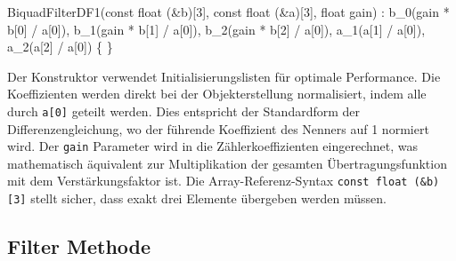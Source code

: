 \documentclass[
  ngerman,
  letterpaper,
  DIV=11]{scrreprt}
\newenvironment{Shaded}{\begin{snugshade}}{\end{snugshade}}
\newcommand{\AttributeTok}[1]{\textcolor[rgb]{0.40,0.45,0.13}{#1}}
\newcommand{\DataTypeTok}[1]{\textcolor[rgb]{0.68,0.00,0.00}{#1}}
\newcommand{\DecValTok}[1]{\textcolor[rgb]{0.68,0.00,0.00}{#1}}
\newcommand{\NormalTok}[1]{\textcolor[rgb]{0.00,0.23,0.31}{#1}}
\newcommand{\OperatorTok}[1]{\textcolor[rgb]{0.37,0.37,0.37}{#1}}
\begin{document}
\begin{Shaded}
\begin{Highlighting}[]
\NormalTok{BiquadFilterDF1}\OperatorTok{(}\AttributeTok{const} \DataTypeTok{float} \OperatorTok{(\&}\NormalTok{b}\OperatorTok{)[}\DecValTok{3}\OperatorTok{],} \AttributeTok{const} \DataTypeTok{float} \OperatorTok{(\&}\NormalTok{a}\OperatorTok{)[}\DecValTok{3}\OperatorTok{],} \DataTypeTok{float}\NormalTok{ gain}\OperatorTok{)}  
    \OperatorTok{:}\NormalTok{ b\_0}\OperatorTok{(}\NormalTok{gain }\OperatorTok{*}\NormalTok{ b}\OperatorTok{[}\DecValTok{0}\OperatorTok{]} \OperatorTok{/}\NormalTok{ a}\OperatorTok{[}\DecValTok{0}\OperatorTok{]),}
\NormalTok{      b\_1}\OperatorTok{(}\NormalTok{gain }\OperatorTok{*}\NormalTok{ b}\OperatorTok{[}\DecValTok{1}\OperatorTok{]} \OperatorTok{/}\NormalTok{ a}\OperatorTok{[}\DecValTok{0}\OperatorTok{]),}
\NormalTok{      b\_2}\OperatorTok{(}\NormalTok{gain }\OperatorTok{*}\NormalTok{ b}\OperatorTok{[}\DecValTok{2}\OperatorTok{]} \OperatorTok{/}\NormalTok{ a}\OperatorTok{[}\DecValTok{0}\OperatorTok{]),}
\NormalTok{      a\_1}\OperatorTok{(}\NormalTok{a}\OperatorTok{[}\DecValTok{1}\OperatorTok{]} \OperatorTok{/}\NormalTok{ a}\OperatorTok{[}\DecValTok{0}\OperatorTok{]),}
\NormalTok{      a\_2}\OperatorTok{(}\NormalTok{a}\OperatorTok{[}\DecValTok{2}\OperatorTok{]} \OperatorTok{/}\NormalTok{ a}\OperatorTok{[}\DecValTok{0}\OperatorTok{])} 
\OperatorTok{\{}
\OperatorTok{\}}
\end{Highlighting}
\end{Shaded}

Der Konstruktor verwendet Initialisierungslisten für optimale
Performance. Die Koeffizienten werden direkt bei der Objekterstellung
normalisiert, indem alle durch \texttt{a{[}0{]}} geteilt werden. Dies
entspricht der Standardform der Differenzengleichung, wo der führende
Koeffizient des Nenners auf 1 normiert wird. Der \texttt{gain} Parameter
wird in die Zählerkoeffizienten eingerechnet, was mathematisch
äquivalent zur Multiplikation der gesamten Übertragungsfunktion mit dem
Verstärkungsfaktor ist. Die Array-Referenz-Syntax
\texttt{const\ float\ (\&b){[}3{]}} stellt sicher, dass exakt drei
Elemente übergeben werden müssen.

\subsection{Filter Methode}\label{filter-methode}
\end{document}
